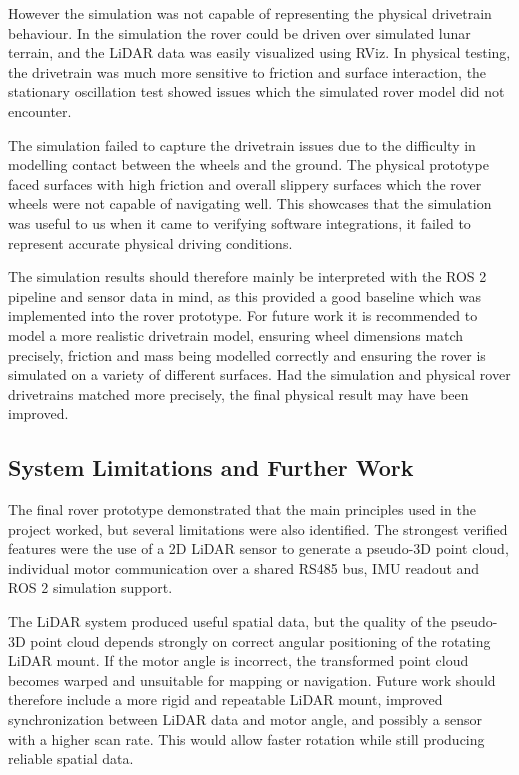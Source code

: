 However the simulation was not capable of representing the physical drivetrain behaviour. In the simulation the rover could be driven over simulated lunar terrain, 
and the LiDAR data was easily visualized using RViz.
In physical testing, the drivetrain was much more sensitive to friction and surface interaction, 
the stationary oscillation test showed issues which the simulated rover model did not encounter.

The simulation failed to capture the drivetrain issues due to the difficulty in modelling contact between the wheels and the ground. The physical prototype faced surfaces 
with high friction and overall slippery surfaces which the rover wheels were not capable of navigating well.
This showcases that the simulation was useful to us when it came to verifying software integrations, it failed to represent accurate physical driving conditions.

The simulation results should therefore mainly be interpreted with the ROS 2 pipeline and sensor data in mind, as this provided a good baseline which was implemented into the rover prototype.
For future work it is recommended to model a more realistic drivetrain model, ensuring wheel dimensions match precisely, 
friction and mass being modelled correctly and ensuring the rover is simulated on a variety of different surfaces.
Had the simulation and physical rover drivetrains matched more precisely, the final physical result may have been improved.

\subsection{System Limitations and Further Work}

The final rover prototype demonstrated that the main principles used in the project worked, but several limitations were also identified. The strongest verified features were the use of a 2D LiDAR sensor to generate a pseudo-3D point cloud, individual motor communication over a shared RS485 bus, IMU readout and ROS 2 simulation support.

The LiDAR system produced useful spatial data, but the quality of the pseudo-3D point cloud depends strongly on correct angular positioning of the rotating LiDAR mount. If the motor angle is incorrect, the transformed point cloud becomes warped and unsuitable for mapping or navigation. Future work should therefore include a more rigid and repeatable LiDAR mount, improved synchronization between LiDAR data and motor angle, and possibly a sensor with a higher scan rate. This would allow faster rotation while still producing reliable spatial data.

